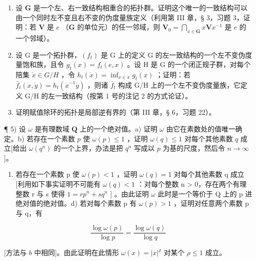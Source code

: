 \begin{enumerate}
\def\labelenumi{\arabic{enumi})}
\setcounter{enumi}{1}
\item
  设 \(\mathbf{G}\) 是一个左、右一致结构相重合的拓扑群。证明这个唯一的一致结构可以由一个同时左不变且右不变的伪度量族定义（利用第 III 章，§ 3，习题 3，证明：若 \(\mathbf{V}\) 是 \(e\) （\(\mathbf{G}\) 的单位元）的任一邻域，则 \(\mathbf{V}_0 = \bigcap_{x\in \mathbf{G}}x\mathbf{V}x^{-1}\) 是 \(e\) 的一个邻域）。
\item
  设 G 是一个拓扑群，\((f_{t})\) 是 G 上的定义 G 的左一致结构的一个左不变伪度量饱和族，且令 \(g_{t}(x)=f_{t}(e,x)\) 。设 H 是 G 的一个闭正规子群，对每个陪集 \(\dot{x}\in G/H\) ，令 \(h_{t}(\dot{x})=\inf_{x\in \dot{x}}g_{t}(x)\) ；证明：若 \(\bar{f}_{t}(\dot{x},\dot{y})=h_{t}(\dot{x}^{-1}\dot{y})\) ，则诸 \(\bar{f}_{t}\) 构成 G/H 上的一个左不变伪度量族，它定义 G/H 的左一致结构（按第 1 号的注记 2 的方式论证）。
\item
  证明赋值除环的拓扑是局部逆有界的（第 III 章，§ 6，习题 22）。
\end{enumerate}

¶ 5) 设 \(\omega\) 是有理数域 \(\mathbf{Q}\) 上的一个绝对值。a) 证明 \(\omega\) 由它在素数处的值唯一确定。b) 若存在一个素数 \(p\) 使 \(\omega(p) \leqslant 1\) ，证明 \(\omega(q) \leqslant 1\) 对每个其他素数 \(q\) 成立{[}给出 \(\omega(q^n)\) 的一个上界，办法是把 \(q^n\) 写成以 \(p\) 为基的尺度，然后令 \(n \to \infty\) {]}。

\begin{enumerate}
\def\labelenumi{\alph{enumi})}
\setcounter{enumi}{2}
\tightlist
\item
  若存在一个素数 p 使 \(\omega(p) < 1\) ，证明 \(\omega(q) = 1\) 对每个其他素数 q 成立{[}利用如下事实证明不可能有 \(\omega(q) < 1\) ：对每个整数 n \textgreater{} 0，存在两个有理整数 r 与 s 使得 \(1 = rp^{n} + sq^{n}\) {]} 。由此证明 \(\omega\) 此时是一个等价于 Q 上的 p 进绝对值的绝对值。d) 若对每个素数 p 有 \(\omega(p) > 1\) ，证明对任意两个素数 p 与 q，有
\end{enumerate}

\[
\frac {\log \omega (p)}{\log p} = \frac {\log \omega (q)}{\log q}
\]

{[}方法与 \(b\) 中相同{]}。由此证明在此情形 \(\omega(x) = |x|^{\rho}\) 对某个 \(\rho \leqslant 1\) 成立。

